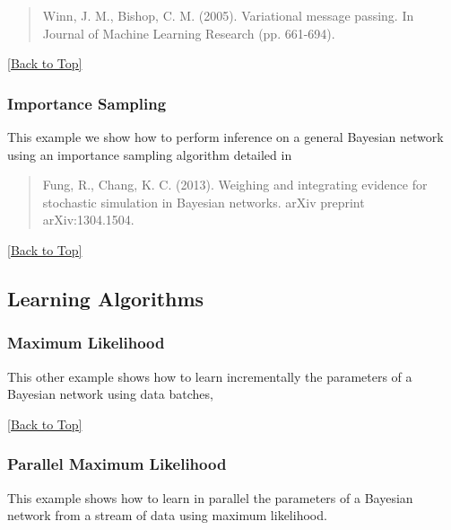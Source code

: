 \documentclass[10pt,a4paper]{article}
\begin{document}
 \begin{quotation}
 	Winn, J. M., Bishop, C. M. (2005). Variational message passing. In Journal of Machine Learning Research (pp. 661-694).
 \end{quotation}

\hyperref[sec:bns]{[Back to Top]}\newline 



\subsubsection{Importance Sampling}\label{sec:bns:inference:sampling}
This example we show how to perform inference on a general Bayesian network using an importance sampling algorithm detailed in

\begin{quotation}
Fung, R., Chang, K. C. (2013). Weighing and integrating evidence for stochastic simulation in Bayesian networks. arXiv preprint arXiv:1304.1504.
\end{quotation}

\hyperref[sec:bns]{[Back to Top]}\newline 


\subsection{Learning Algorithms}\label{sec:bns:learning}
\subsubsection{Maximum Likelihood}\label{sec:bns:learning:batchml}
This other example shows how to learn incrementally the parameters of a Bayesian network using data batches,

\hyperref[sec:bns]{[Back to Top]}\newline 


\subsubsection{Parallel Maximum Likelihood}\label{sec:bns:learning:parallelml}
This example shows how to learn in parallel the parameters of a Bayesian network from a stream of data using maximum likelihood.
\end{document}
